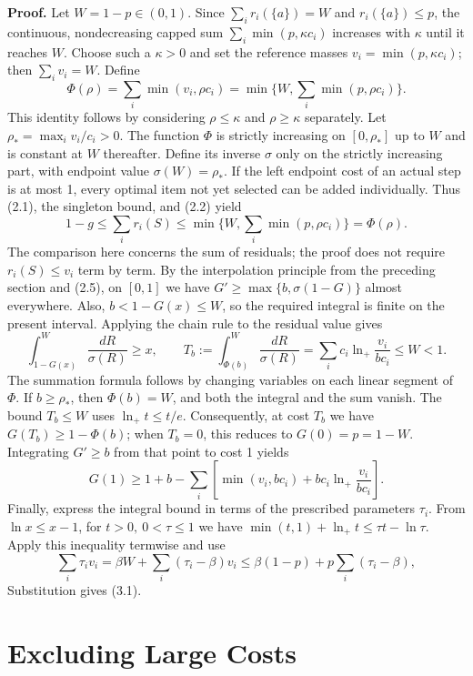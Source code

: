 \documentclass[11pt,a4paper]{article}
\begin{document}
\textbf{Proof.} Let $W=1-p\in(0,1)$. Since $\sum_i r_i(\{a\})=W$ and $r_i(\{a\})\le p$, the continuous, nondecreasing capped sum $\sum_i\min(p,\kappa c_i)$ increases with $\kappa$ until it reaches $W$. Choose such a $\kappa>0$ and set the reference masses $v_i=\min(p,\kappa c_i)$; then $\sum_i v_i=W$. Define
\[
\Phi(\rho)=\sum_i\min(v_i,\rho c_i)
=\min\{W,\sum_i\min(p,\rho c_i)\}.
\]
This identity follows by considering $\rho\le\kappa$ and $\rho\ge\kappa$ separately.
Let $\rho_*=\max_i v_i/c_i>0$. The function $\Phi$ is strictly increasing on $[0,\rho_*]$ up to $W$ and is constant at $W$ thereafter. Define its inverse $\sigma$ only on the strictly increasing part, with endpoint value $\sigma(W)=\rho_*$.
If the left endpoint cost of an actual step is at most 1, every optimal item not yet selected can be added individually. Thus (2.1), the singleton bound, and (2.2) yield
\[
1-g\le\sum_i r_i(S)\le\min\{W,\sum_i\min(p,\rho c_i)\}=\Phi(\rho).
\]
The comparison here concerns the sum of residuals; the proof does not require $r_i(S)\le v_i$ term by term. By the interpolation principle from the preceding section and (2.5), on $[0,1]$ we have $G'\ge\max\{b,\sigma(1-G)\}$ almost everywhere.
Also, $b<1-G(x)\le W$, so the required integral is finite on the present interval. Applying the chain rule to the residual value gives
\[
\int_{1-G(x)}^W\frac{dR}{\sigma(R)}\ge x,\qquad
T_b:=\int_{\Phi(b)}^W\frac{dR}{\sigma(R)}
=\sum_i c_i\ln_+\frac{v_i}{bc_i}\le W<1.
\]
The summation formula follows by changing variables on each linear segment of $\Phi$. If $b\ge\rho_*$, then $\Phi(b)=W$, and both the integral and the sum vanish. The bound $T_b\le W$ uses $\ln_+t\le t/e$. Consequently, at cost $T_b$ we have $G(T_b)\ge1-\Phi(b)$; when $T_b=0$, this reduces to $G(0)=p=1-W$. Integrating $G'\ge b$ from that point to cost 1 yields
\[
G(1)\ge1+b-\sum_i\left[\min(v_i,bc_i)+bc_i\ln_+\frac{v_i}{bc_i}\right].
\]
Finally, express the integral bound in terms of the prescribed parameters $\tau_i$. From $\ln x\le x-1$, for $t>0,\ 0<\tau\le1$ we have
$\min(t,1)+\ln_+t\le\tau t-\ln\tau$. Apply this inequality termwise and use
\[
\sum_i\tau_i v_i
=\beta W+\sum_i(\tau_i-\beta)v_i
\le\beta(1-p)+p\sum_i(\tau_i-\beta),
\]
Substitution gives (3.1).

\section{Excluding Large Costs}
\end{document}
